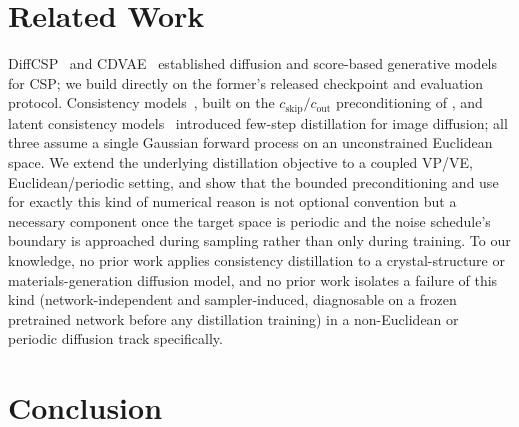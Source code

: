 \documentclass{article}
\begin{document}
\section{Related Work}

DiffCSP~\citep{Jiao:2023diffcsp} and CDVAE~\citep{Xie:2022cdvae} established diffusion and score-based generative models for CSP; we build directly on the former's released checkpoint and evaluation protocol. Consistency models~\citep{Song:2023cm}, built on the $c_{\text{skip}}/c_{\text{out}}$ preconditioning of \citet{Karras:2022edm}, and latent consistency models~\citep{Luo:2023lcm} introduced few-step distillation for image diffusion; all three assume a single Gaussian forward process on an unconstrained Euclidean space. We extend the underlying distillation objective to a coupled VP/VE, Euclidean/periodic setting, and show that the bounded preconditioning \citet{Karras:2022edm} and \citet{Song:2023cm} use for exactly this kind of numerical reason is not optional convention but a necessary component once the target space is periodic and the noise schedule's boundary is approached during sampling rather than only during training. To our knowledge, no prior work applies consistency distillation to a crystal-structure or materials-generation diffusion model, and no prior work isolates a failure of this kind (network-independent and sampler-induced, diagnosable on a frozen pretrained network before any distillation training) in a non-Euclidean or periodic diffusion track specifically.

\section{Conclusion}
\end{document}
